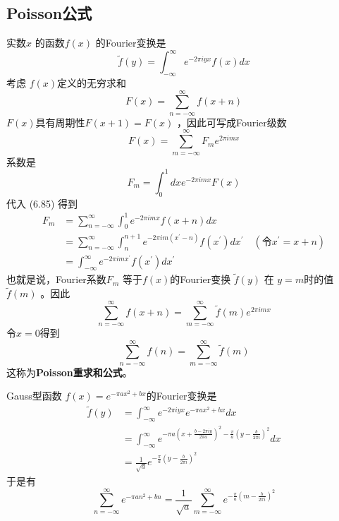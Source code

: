 \subsection{ Poisson公式}
实数$ x$ 的函数$ f(x)$ 的Fourier变换是
\begin{equation}
	\tilde{f}(y)=\int_{-\infty}^{\infty} e^{-2 \pi i y x} f(x) d x
\end{equation} 
考虑 $f(x) $定义的无穷求和
\begin{equation}
F(x)=\sum_{n=-\infty}^{\infty} f(x+n)	
\end{equation}
$F(x) $具有周期性$ F(x+1)=F(x)$ ，因此可写成Fourier级数
\begin{equation}
	F(x)=\sum_{m=-\infty}^{\infty} F_{m} e^{2 \pi i m x}
\end{equation} 
系数是
\begin{equation}
	F_{m}=\int_{0}^{1} d x e^{-2 \pi i m x} F(x) 
\end{equation}
代入 (6.85) 得到
\begin{equation}
	\begin{aligned} F_{m} &=\sum_{n=-\infty}^{\infty} \int_{0}^{1} e^{-2 \pi i m x} f(x+n) d x \\ &=\sum_{n=-\infty}^{\infty} \int_{n}^{n+1} e^{-2 \pi i m\left(x^{\prime}-n\right)} f\left(x^{\prime}\right) d x^{\prime} \quad\left(令x^{\prime}=x+n \right) \\ &=\int_{-\infty}^{\infty} e^{-2 \pi i m x^{\prime}} f\left(x^{\prime}\right) d x^{\prime} \end{aligned}
\end{equation}
也就是说，Fourier系数$ F_m$ 等于$ f(x) $的Fourier变换 $\tilde{f}(y)$ 在 $y=m $时的值 $\tilde{f}(m)$ 。因此
\begin{equation}
	\sum_{n=-\infty}^{\infty} f(x+n)=\sum_{m=-\infty}^{\infty} \tilde{f}(m) e^{2 \pi i m x}
\end{equation}
令$ x=0 $得到
\begin{equation}
	\sum_{n=-\infty}^{\infty} f(n)=\sum_{m=-\infty}^{\infty} \tilde{f}(m)
\end{equation} 
这称为\textbf{Poisson重求和公式}。

Gauss型函数 $f(x)=e^{-\pi a x^{2}+b x} $的Fourier变换是
\begin{equation}
	\begin{aligned} \tilde{f}(y) &=\int_{-\infty}^{\infty} e^{-2 \pi i y x} e^{-\pi a x^{2}+b x} d x \\ &=\int_{-\infty}^{\infty} e^{-\pi a\left(x+\frac{b-2 \pi i y}{2 \pi a}\right)^{2}-\frac{\pi}{a}\left(y-\frac{b}{2 \pi i}\right)^{2}} d x \\ &=\frac{1}{\sqrt{a}} e^{-\frac{\pi}{a}\left(y-\frac{b}{2 \pi i}\right)^{2}} \end{aligned}
\end{equation} 
于是有
\begin{equation}
	\sum_{n=-\infty}^{\infty} e^{-\pi a n^{2}+b n}=\frac{1}{\sqrt{a}} \sum_{m=-\infty}^{\infty} e^{-\frac{\pi}{a}\left(m-\frac{b}{2 \pi i}\right)^{2}} 
\end{equation}

